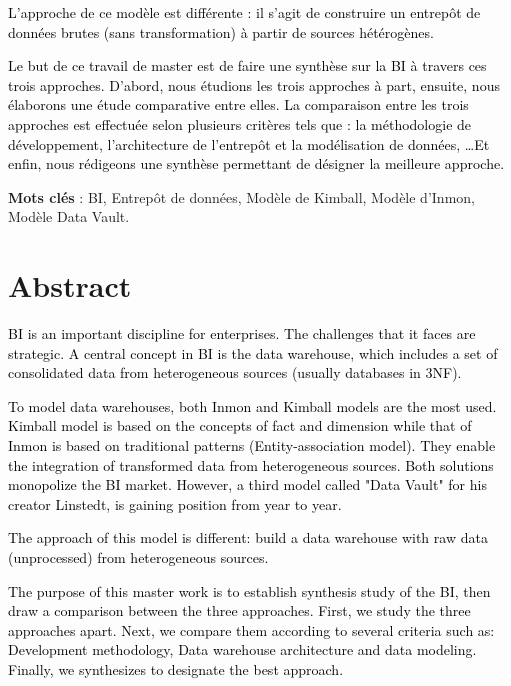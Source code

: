 \documentclass[a4paper,12pt]{report}
\begin{document}
\textcolor{black}{L’approche de ce modèle est différente : il s’agit de construire un entrepôt de données brutes (sans transformation) à partir de sources hétérogènes. }

\textcolor{black}{Le but de ce travail de master est de faire une synthèse sur la BI à travers ces trois approches. D’abord, nous étudions les trois approches à part, ensuite, nous élaborons une étude comparative entre elles. La comparaison entre les trois approches est effectuée selon plusieurs critères tels que : la méthodologie de développement, l’architecture de l’entrepôt et la modélisation de données, …Et enfin, nous rédigeons une synthèse permettant de désigner la meilleure approche.}


 
\textbf{Mots clés} : BI, Entrepôt de données, Modèle de Kimball, Modèle d’Inmon, Modèle Data Vault.



\newpage

\chapter*{Abstract}


\textcolor{black}{BI is an important discipline for enterprises. The challenges that it faces are strategic. A central concept in BI is the data warehouse, which includes a set of consolidated data from heterogeneous sources (usually databases in 3NF). }

\textcolor{black}{To model data warehouses, both Inmon and Kimball models are the most used. Kimball model is based on the concepts of fact and dimension while that of Inmon is based on traditional patterns (Entity-association model). They enable the integration of transformed data from heterogeneous sources. Both solutions monopolize the BI market. However, a third model called "Data Vault" for his creator Linstedt, is gaining position from year to year.}


\textcolor{black}{
 The approach of this model is different: build a data warehouse with raw data (unprocessed) from heterogeneous sources.
}


\textcolor{black}{The purpose of this master work is to establish synthesis study of the BI, then draw a comparison between the three approaches. First, we study the three approaches apart. Next, we compare them according to several criteria such as: Development methodology, Data warehouse architecture and data modeling. Finally, we synthesizes to designate the best approach.}
\end{document}
